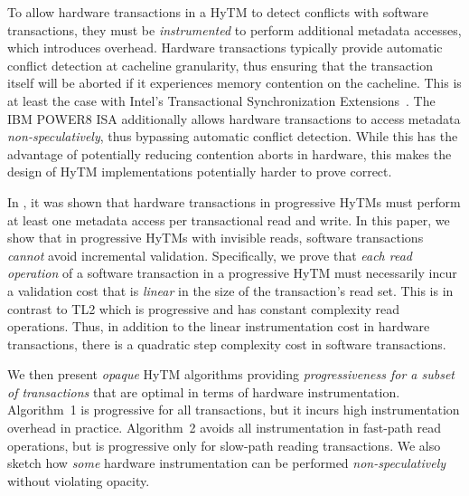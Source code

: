 To allow hardware transactions in a HyTM to detect conflicts with software transactions, they must be \emph{instrumented} to perform additional metadata accesses, which introduces overhead.
Hardware transactions typically provide automatic conflict detection at cacheline granularity,
thus ensuring that the transaction itself will be aborted if it experiences memory contention on the cacheline.
This is at least the case with Intel's Transactional Synchronization Extensions~\cite{haswell}.
The IBM POWER8 ISA additionally allows hardware transactions to access metadata \emph{non-speculatively}, 
thus bypassing automatic conflict detection. While this has the advantage of potentially reducing contention aborts
in hardware, this makes the design of HyTM implementations potentially harder to prove correct.

In \cite{htmdisc15}, it was shown that hardware transactions in progressive HyTMs must perform
at least one metadata access per transactional read and write.
In this paper, we show that in progressive HyTMs with invisible reads, 
software transactions \textit{cannot} avoid incremental validation.
Specifically, we prove that \textit{each read operation} of a software transaction in a progressive HyTM
must necessarily incur a validation cost that is \emph{linear} 
in the size of the transaction's read set. 
This is in contrast to TL2 which is progressive and has constant complexity read operations.
Thus, in addition to the linear instrumentation cost in hardware transactions, there is a quadratic step complexity cost in software transactions.

We then present \emph{opaque} HyTM algorithms providing \emph{progressiveness for a subset of transactions} that are  %
optimal in terms of hardware instrumentation.
Algorithm~1 is progressive for all transactions, but it incurs high instrumentation overhead in practice.
Algorithm~2 avoids all instrumentation in fast-path read operations, but is progressive only for slow-path reading transactions.
We also sketch how \emph{some} hardware instrumentation can be performed \textit{non-speculatively} without violating opacity.

